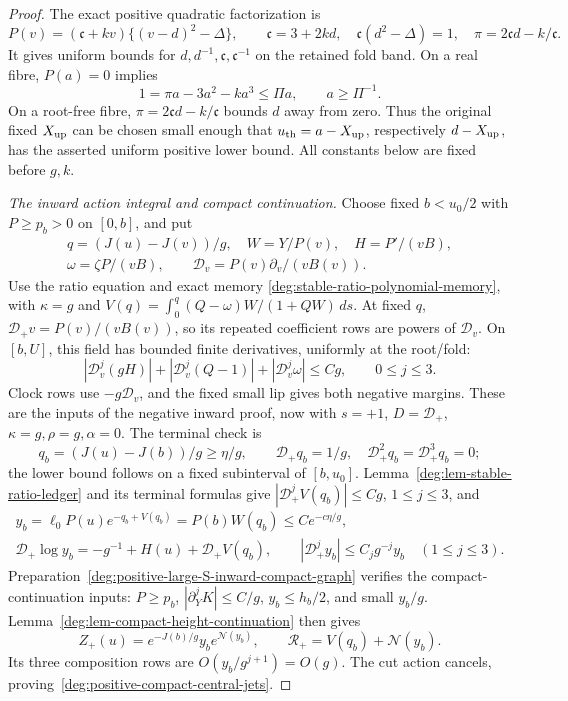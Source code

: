 \begin{proof}
The exact positive quadratic factorization is
\[
 P(v)=(\mathfrak c+kv)\{(v-d)^2-\Delta\},\qquad
 \mathfrak c=3+2kd,\quad
 \mathfrak c(d^2-\Delta)=1,\quad
 \pi=2\mathfrak cd-k/\mathfrak c.
\]
It gives uniform bounds for
\(d,d^{-1},\mathfrak c,\mathfrak c^{-1}\) on the retained fold band.
On a real fibre, \(P(a)=0\) implies
\[
 1=\pi a-3a^2-ka^3\le\Pi a,\qquad a\ge\Pi^{-1}.
\]
On a root-free fibre,
\(\pi=2\mathfrak cd-k/\mathfrak c\) bounds \(d\) away from zero.
Thus the original fixed \(X_{\rm up}\) can be chosen small enough
that \(u_{\rm th}=a-X_{\rm up}\), respectively \(d-X_{\rm up}\),
has the asserted uniform positive lower bound. All constants below
are fixed before \(g,k\).

\smallskip
\noindent\emph{The inward action integral and compact continuation.}
Choose fixed \(b<u_0/2\) with \(P\ge p_b>0\) on \([0,b]\), and put
\[
 \begin{gathered}
 q=(J(u)-J(v))/g,\quad W=Y/P(v),\quad H=P'/(vB),\\
 \omega=\zeta P/(vB),\qquad
 \mathcal D_v=P(v)\partial_v/(vB(v)).
 \end{gathered}
\]
Use the ratio equation and exact memory
\eqref{deg:stable-ratio-polynomial-memory}, with \(\kappa=g\)
and \(V(q)=\int_0^q(Q-\omega)W/(1+QW)\,ds\).
At fixed \(q\), \(\mathcal D_+v=P(v)/(vB(v))\), so its repeated
coefficient rows are powers of \(\mathcal D_v\). On \([b,U]\),
this field has bounded finite derivatives, uniformly at the root/fold:
\begin{equation}\label{deg:positive-compact-inward-coefficients}
 |\mathcal D_v^j(gH)|+|\mathcal D_v^j(Q-1)|+|\mathcal D_v^j\omega|
 \le Cg,\qquad0\le j\le3.
\end{equation}
Clock rows use \(-g\mathcal D_v\), and the fixed small lip gives
both negative margins. These are the inputs of the negative inward proof,
now with \(s=+1\), \(D=\mathcal D_+\), \(\kappa=g,\rho=g,\alpha=0\).
The terminal check is
\[
 q_b=(J(u)-J(b))/g\ge\eta/g,\qquad
 \mathcal D_+q_b=1/g,\quad \mathcal D_+^2q_b=\mathcal D_+^3q_b=0;
\]
the lower bound follows on a fixed subinterval of \([b,u_0]\).
Lemma~\ref{deg:lem-stable-ratio-ledger} and its terminal formulas give
\(|\mathcal D_+^jV(q_b)|\le Cg\), \(1\le j\le3\), and
\begin{equation}\label{deg:positive-compact-central-incoming-height}
 \begin{gathered}
 y_b=\ell_0P(u)e^{-q_b+V(q_b)}=P(b)W(q_b)\le Ce^{-c\eta/g},\\
 \mathcal D_+\log y_b=-g^{-1}+H(u)+\mathcal D_+V(q_b),\qquad
 |\mathcal D_+^jy_b|\le C_jg^{-j}y_b\quad(1\le j\le3).
 \end{gathered}
\end{equation}
Preparation~\eqref{deg:positive-large-S-inward-compact-graph} verifies
the compact-continuation inputs: \(P\ge p_b\),
\(|\partial_Y^jK|\le C/g\), \(y_b\le h_b/2\), and small \(y_b/g\).
Lemma~\ref{deg:lem-compact-height-continuation} then gives
\[
 Z_+(u)=e^{-J(b)/g}y_be^{\mathcal N(y_b)},\qquad
 \mathcal R_+=V(q_b)+\mathcal N(y_b).
\]
Its three composition rows are \(O(y_b/g^{j+1})=O(g)\).
The cut action cancels, proving~\eqref{deg:positive-compact-central-jets}.


\end{proof}
